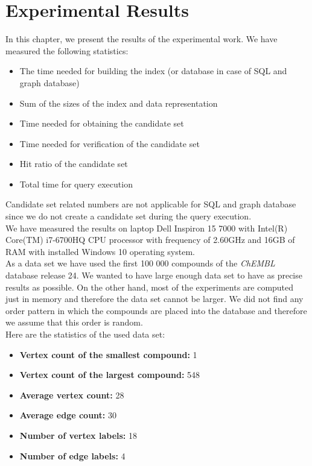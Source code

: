 \chapter{Experimental Results}

In this chapter, we present the results of the experimental work. We have measured the following statistics:

\begin{itemize}
	\item The time needed for building the index (or database in case of SQL and graph database)
	\item Sum of the sizes of the index and data representation
	\item Time needed for obtaining the candidate set
	\item Time needed for verification of the candidate set
	\item Hit ratio of the candidate set
	\item Total time for query execution
\end{itemize}

Candidate set related numbers are not applicable for SQL and graph database since we do not create a candidate set during the query execution.\\

We have measured the results on laptop Dell Inspiron 15 7000 with Intel(R) Core(TM) i7-6700HQ CPU processor with frequency of 2.60GHz and 16GB of RAM with installed Windows 10 operating system.\\

As a data set we have used the first 100 000 compounds of the \textit{ChEMBL} database \cite{chembl} release 24. We wanted to have large enough data set to have as precise results as possible. On the other hand, most of the experiments are computed just in memory and therefore the data set cannot be larger. We did not find any order pattern in which the compounds are placed into the database and therefore we assume that this order is random.\\

Here are the statistics of the used data set:

\begin{itemize}
	\item \textbf{Vertex count of the smallest compound:} 1
	\item \textbf{Vertex count of the largest compound:} 548
	\item \textbf{Average vertex count:} 28
	\item \textbf{Average edge count:} 30 
	\item \textbf{Number of vertex labels:} 18 
	\item \textbf{Number of edge labels:} 4 
\end{itemize}

